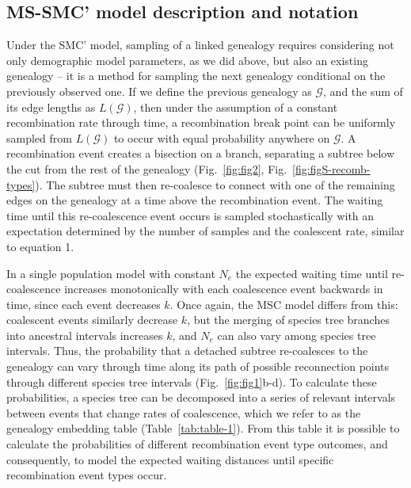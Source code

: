\documentclass[11pt]{article}
\begin{document}

\subsection{MS-SMC' model description and notation}

Under the SMC' model, sampling of a linked genealogy requires considering not only 
demographic model parameters, 
as we did above, but also an existing genealogy -- it is a method 
for sampling the next genealogy conditional on the previously observed one. 
If we define the previous genealogy as $\mathcal{G}$, and the sum of its edge lengths 
as $L(\mathcal{G})$, then under the assumption of a constant recombination rate through time,
a recombination break point can be uniformly sampled from $L(\mathcal{G})$ to occur with 
equal probability anywhere on $\mathcal{G}$. 
A recombination event creates a bisection on a branch, separating a subtree 
below the cut from the rest of the genealogy 
(Fig.~\ref{fig:fig2}, Fig.~\ref{fig:figS-recomb-types}).
The subtree must then re-coalesce to connect with one of the remaining edges on 
the genealogy at a time above the recombination event. The waiting time until 
this re-coalescence event occurs is sampled stochastically with an expectation 
determined by the number of samples and the coalescent rate, 
similar to equation 1.

In a single population model with constant $N_e$ the expected waiting time until 
re-coalescence increases monotonically with each coalescence event 
backwards in time, since each event decreases $k$.
Once again, the MSC model differs from this: 
coalescent events similarly decrease $k$, but the merging of 
species tree branches into ancestral intervals increases $k$, and $N_e$ 
can also vary among species tree intervals. 
Thus, the probability that a detached subtree re-coalesces to the genealogy 
can vary through time along its path of possible reconnection points through 
different species tree intervals
(Fig.~\ref{fig:fig1}b-d).
To calculate these probabilities, a species tree can be decomposed into a 
series of relevant intervals between events that change rates of coalescence,
which we refer to as the genealogy embedding table (Table~\ref{tab:table-1}). 
From this table it is possible to calculate the probabilities of different
recombination event type outcomes, and consequently, to model the expected 
waiting distances until specific recombination event types occur. 
\end{document}
